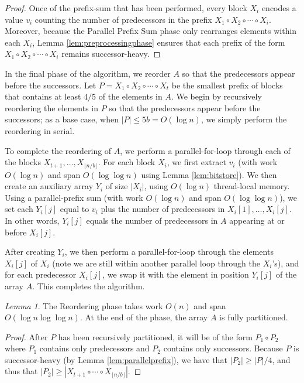 \documentclass[sigplan, 10pt, nonacm]{acmart}
\renewcommand{\paragraph}[1]{\vspace{0.09in}\noindent{\bf \boldmath #1.}}
\theoremstyle{remark}
\newtheorem{lemma}[thm]{Lemma}
\theoremstyle{remark}
\begin{document}
\begin{appendices}
\begin{proof}
Once of the prefix-sum that has been performed, every block $X_i$
encodes a value $v_i$ counting the number of predecessors in the
prefix $X_1 \circ X_2 \circ \cdots \circ X_i$. Moreover, because the
Parallel Prefix Sum phase only rearranges elements within each $X_i$,
Lemma \ref{lem:preprocessingphase} ensures that each prefix of the
form $X_1 \circ X_2 \circ \cdots \circ X_i$ remains successor-heavy.
\end{proof}

\paragraph{In-Place Reordering}
In the final phase of the algorithm, we reorder $A$ so that the
predecessors appear before the successors. Let $P = X_1 \circ X_2
\circ \cdots \circ X_t$ be the smallest prefix of blocks that contains
at least $4/5$ of the elements in $A$. We begin by recursively
reordering the elements in $P$ so that the predecessors appear before
the successors; as a base case, when $|P| \le 5b = O(\log n)$, we
simply perform the reordering in serial.

To complete the reordering of $A$, we perform a parallel-for-loop
through each of the blocks $X_{t + 1}, \ldots, X_{\lfloor n / b \rfloor}$. For each block
$X_i$, we first extract $v_i$ (with work $O(\log n)$ and span $O(\log
\log n)$ using Lemma \ref{lem:bitstore}). We then create an auxiliary
array $Y_i$ of size $|X_i|$, using $O(\log n)$ thread-local
memory. Using a parallel-prefix sum (with work $O(\log n)$ and span
$O(\log \log n)$), we set each $Y_i[j]$ equal to $v_i$ plus the number
of predecessors in $X_i[1], \ldots, X_i[j]$. In other words, $Y_i[j]$
equals the number of predecessors in $A$ appearing at or before
$X_i[j]$.

After creating $Y_i$, we then perform a parallel-for-loop through the
elements $X_i[j]$ of $X_i$ (note we are still within another parallel
loop through the $X_i$'s), and for each predecessor $X_i[j]$, we swap
it with the element in position $Y_i[j]$ of the array $A$. This
completes the algorithm.

\begin{lemma}
 The Reordering phase takes work $O(n)$ and span $O(\log n \log \log
 n)$. At the end of the phase, the array $A$ is fully partitioned.
\end{lemma}
\begin{proof}
After $P$ has been recursively partitioned, it will be of the form
$P_1 \circ P_2$ where $P_1$ contains only predecessors and $P_2$
contains only successors. Because $P$ is successor-heavy (by Lemma
\ref{lem:parallelprefix}), we have that $|P_2| \ge |P| / 4$, and thus
that $|P_2| \ge |X_{t + 1} \circ \cdots \circ X_{\lfloor n / b
  \rfloor}|$.


\end{proof}
\end{appendices}
\end{document}
